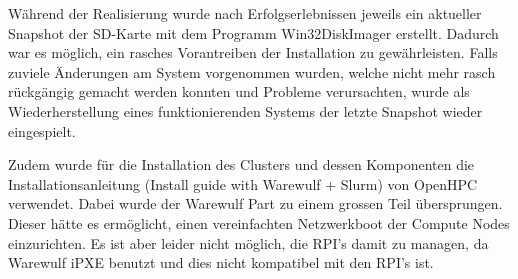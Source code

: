 Während der Realisierung wurde nach Erfolgserlebnissen jeweils ein aktueller Snapshot der SD-Karte mit dem Programm Win32DiskImager erstellt. Dadurch war es möglich, ein rasches Vorantreiben der Installation zu gewährleisten. Falls zuviele Änderungen am System vorgenommen wurden, welche nicht mehr rasch rückgängig gemacht werden konnten und Probleme verursachten, wurde als Wiederherstellung eines funktionierenden Systems der letzte Snapshot wieder eingespielt.

Zudem wurde für die Installation des Clusters und dessen Komponenten die Installationsanleitung (Install guide with Warewulf + Slurm) von OpenHPC verwendet. Dabei wurde der Warewulf Part zu einem grossen Teil übersprungen. Dieser hätte es ermöglicht, einen vereinfachten Netzwerkboot der Compute Nodes einzurichten. Es ist aber leider nicht möglich, die RPI's damit zu managen, da Warewulf iPXE benutzt und dies nicht kompatibel mit den RPI's ist.







